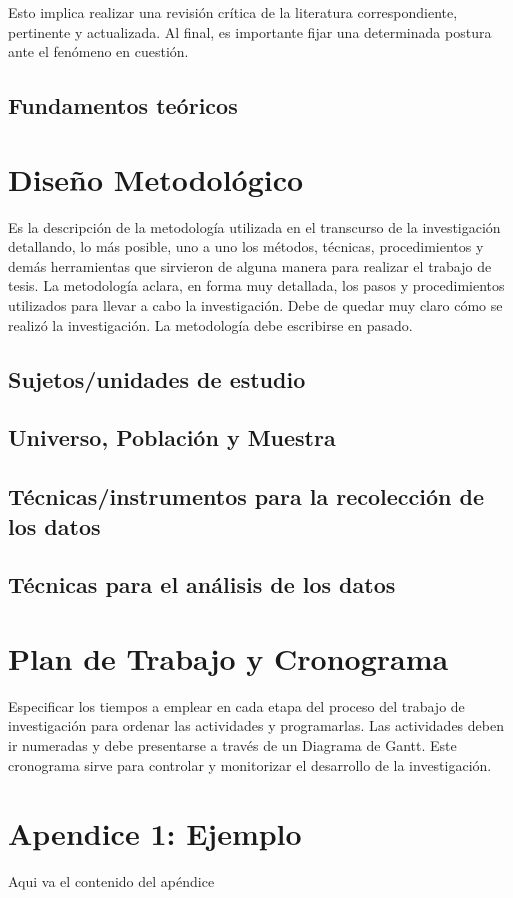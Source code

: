 \documentclass[12]{plan_tesis}
\begin{document}
Esto implica realizar una revisión crítica de la literatura correspondiente, pertinente y actualizada. Al final, es importante fijar una determinada postura ante el fenómeno en cuestión.

\section{Fundamentos teóricos}


\chapter{Diseño Metodológico}

Es la descripción de la metodología utilizada en el transcurso de la investigación detallando, lo más posible, uno a uno los métodos, técnicas, procedimientos y demás herramientas que sirvieron de alguna manera para realizar el trabajo de tesis. 
La metodología aclara, en forma muy detallada, los pasos y procedimientos utilizados para llevar a cabo la investigación. Debe de quedar muy claro cómo se realizó la investigación. La metodología debe escribirse en pasado.

\section{Sujetos/unidades de estudio}
\section{Universo, Población y Muestra }
\section{Técnicas/instrumentos para la recolección de los datos}
\section{Técnicas para el análisis de los datos}

\chapter{Plan de Trabajo y Cronograma}

Especificar los tiempos a emplear en cada etapa del proceso del trabajo de investigación para ordenar las actividades y programarlas. Las actividades deben ir numeradas y debe presentarse a través de un Diagrama de Gantt. Este cronograma sirve para controlar y monitorizar el desarrollo de la investigación. \cite{einstein}





\appendix
\chapter{Apendice 1: Ejemplo}
Aqui va el contenido del apéndice
\end{document}
